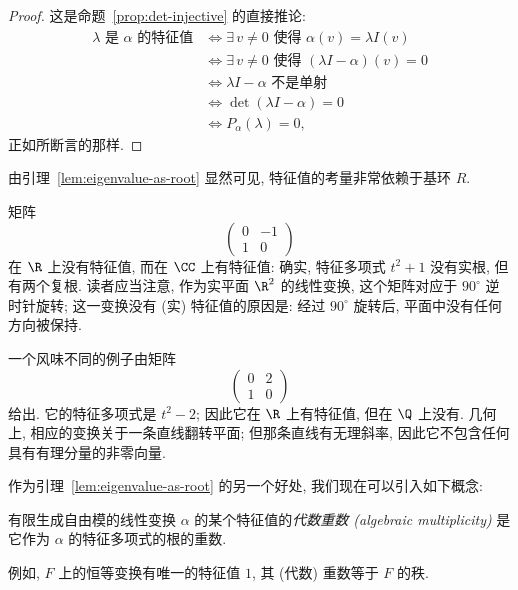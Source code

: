 \begin{proof}
这是命题~\ref{prop:det-injective} 的直接推论:
\[
\begin{aligned}
\lambda \text{ 是 } \alpha \text{ 的特征值}
&\iff \exists\,v\neq0 \text{ 使得 } \alpha(v)=\lambda I(v)\\
&\iff \exists\,v\neq0 \text{ 使得 } (\lambda I-\alpha)(v)=0\\
&\iff \lambda I-\alpha \text{ 不是单射}\\
&\iff \det(\lambda I-\alpha)=0\\
&\iff P_\alpha(\lambda)=0,
\end{aligned}
\]
正如所断言的那样.
\end{proof}

由引理~\ref{lem:eigenvalue-as-root} 显然可见, 特征值的考量非常依赖于基环 $R$.

\begin{example}\label{ex:rotation-no-real-eigenvalue}
矩阵
\[
\begin{pmatrix}0&-1\\1&0\end{pmatrix}
\]
在 $\R$ 上没有特征值, 而在 $\CC$ 上有特征值: 确实, 特征多项式 $t^2+1$ 没有实根, 但有两个复根. 读者应当注意, 作为实平面 $\R^2$ 的线性变换, 这个矩阵对应于 $90^\circ$ 逆时针旋转; 这一变换没有 (实) 特征值的原因是: 经过 $90^\circ$ 旋转后, 平面中没有任何方向被保持.
\end{example}

\begin{example}\label{ex:irrational-slope-eigenvalue}
一个风味不同的例子由矩阵
\[
\begin{pmatrix}0&2\\1&0\end{pmatrix}
\]
给出. 它的特征多项式是 $t^2-2$; 因此它在 $\R$ 上有特征值, 但在 $\Q$ 上没有. 几何上, 相应的变换关于一条直线翻转平面; 但那条直线有无理斜率, 因此它不包含任何具有有理分量的非零向量.
\end{example}

作为引理~\ref{lem:eigenvalue-as-root} 的另一个好处, 我们现在可以引入如下概念:

\begin{definition}\label{def:algebraic-multiplicity}
有限生成自由模的线性变换 $\alpha$ 的某个特征值的\emph{代数重数 (algebraic multiplicity)}
是它作为 $\alpha$ 的特征多项式的根的重数.
\end{definition}

例如, $F$ 上的恒等变换有唯一的特征值 $1$, 其 (代数) 重数等于 $F$ 的秩.

